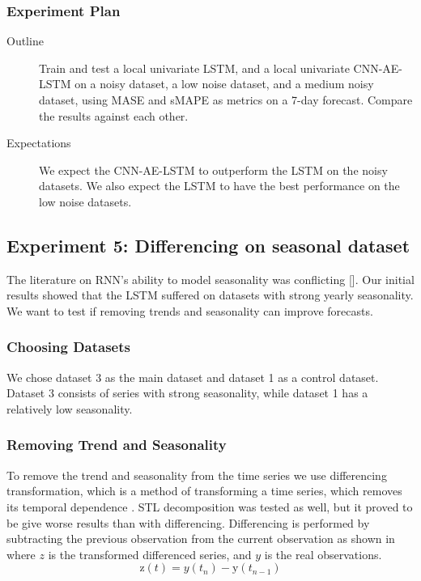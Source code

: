 \subsubsection{Experiment Plan}
\begin{description}
  \item[Outline]{
              Train and test a local univariate LSTM,
              and a local univariate CNN-AE-LSTM on a noisy dataset, a low noise dataset, and a medium noisy dataset,
              using MASE and sMAPE as metrics on a 7-day forecast.
              Compare the results against each other.
        }
\end{description}

\begin{description}
  \item[Expectations]{
              We expect the CNN-AE-LSTM to outperform the LSTM on the noisy datasets.
              We also expect the LSTM to have the best performance on the low noise datasets.
        }
\end{description}

\subsection{Experiment 5: Differencing on seasonal dataset}
\label{section:results:additional-experimental-plan:Experiment-5}
The literature on RNN's ability to model seasonality was conflicting [].
Our initial results showed that the LSTM suffered on datasets with strong yearly seasonality.
We want to test if removing trends and seasonality can improve forecasts.

\subsubsection{Choosing Datasets}
We chose dataset 3 as the main dataset and dataset 1 as a control dataset.
Dataset 3 consists of series with strong seasonality, while dataset 1 has a relatively low seasonality.

\subsubsection{Removing Trend and Seasonality}
To remove the trend and seasonality from the time series
we use differencing transformation, which is a method of transforming a time series,
which removes its temporal dependence \cite[p. 215]{RobJHyndman2014}.
STL decomposition was tested as well, but it proved to be give worse results than with differencing.
Differencing is performed by subtracting the previous observation from the current
observation as shown in  where $z$ is the
transformed differenced series, and $y$ is the real observations.
\begin{equation}
  \text{z}(t) = y(t_n) - \text{y}(t_{ n-1 })
  \label{eq:differencing}
\end{equation}

